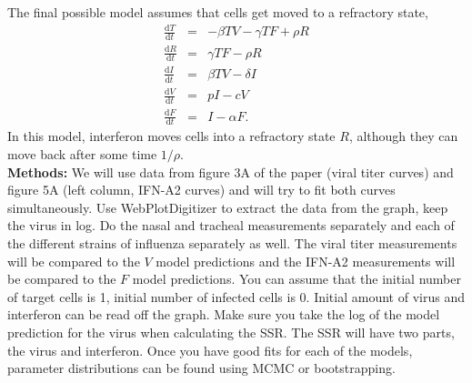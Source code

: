 \documentclass{article}
\newcommand{\bean}{\begin{eqnarray}}
\newcommand{\eean}{\end{eqnarray}}
\newcommand{\dif}{\ensuremath{\mathrm{d}}\xspace}
\begin{document}
\noindent The final possible model assumes that cells get moved to a refractory state,
\bean
\frac{\dif T}{\dif t} &=& - \beta T V  - \gamma TF + \rho R\nonumber\\
\frac{\dif R}{\dif t} &=& \gamma TF - \rho R \nonumber\\
\frac{\dif I}{\dif t} &=& \beta T V - \delta I \\
\frac{\dif V}{\dif t} &=& p I - cV \nonumber \\
\frac{\dif F}{\dif t} &=& I - \alpha F. \nonumber
\eean
In this model, interferon moves cells into a refractory state $R$, although they can move back after some time $1/\rho$.\\

\noindent\textbf{Methods:} We will use data from figure 3A of the paper (viral titer curves) and figure 5A (left column, IFN-A2 curves) and will try to fit both curves simultaneously. Use WebPlotDigitizer to extract the data from the graph, keep the virus in log. Do the nasal and tracheal measurements separately and each of the different strains of influenza separately as well. The viral titer measurements will be compared to the $V$ model predictions and the IFN-A2 measurements will be compared to the $F$ model predictions. You can assume that the initial number of target cells is 1, initial number of infected cells is 0. Initial amount of virus and interferon can be read off the graph. Make sure you take the log of the model prediction for the virus when calculating the SSR. The SSR will have two parts, the virus and interferon. Once you have good fits for each of the models, parameter distributions can be found using MCMC or bootstrapping. 
\end{document}
